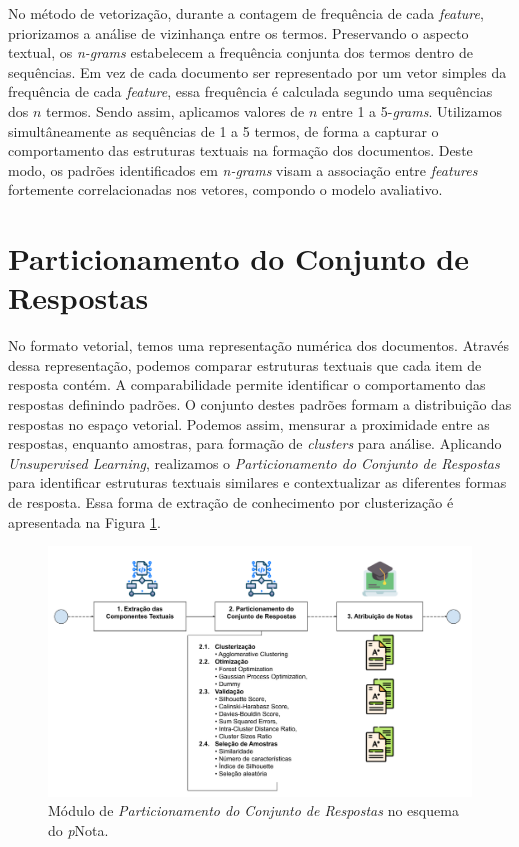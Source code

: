No método de vetorização, durante a contagem de frequência de cada \textit{feature}, priorizamos a análise de vizinhança entre os termos. Preservando o aspecto textual, os \textit{n-grams} estabelecem a frequência conjunta dos termos dentro de sequências. Em vez de cada documento ser representado por um vetor simples da frequência de cada \textit{feature}, essa frequência é calculada segundo uma sequências dos $ n $ termos. Sendo assim, aplicamos valores de $ n $ entre 1 a 5-\textit{grams}. Utilizamos simultâneamente as sequências de 1 a 5 termos, de forma a capturar o comportamento das estruturas textuais na formação dos documentos. Deste modo, os padrões identificados em \textit{n-grams} \cite{spalenza2020} visam a associação entre \textit{features} fortemente correlacionadas nos vetores, compondo o modelo avaliativo.


\section{Particionamento do Conjunto de Respostas}
\label{sec-amostragem}

No formato vetorial, temos uma representação numérica dos documentos. Através dessa representação, podemos comparar estruturas textuais que cada item de resposta contém. A comparabilidade permite identificar o comportamento das respostas definindo padrões. O conjunto destes padrões formam a distribuição das respostas no espaço vetorial. Podemos assim, mensurar a proximidade entre as respostas, enquanto amostras, para formação de \textit{clusters} para análise. Aplicando \textit{Unsupervised Learning}, realizamos o \textit{Particionamento do Conjunto de Respostas} para identificar estruturas textuais similares e contextualizar as diferentes formas de resposta. Essa forma de extração de conhecimento por clusterização é apresentada na Figura \ref{fig-pcr}.

\begin{figure}[!h]
\centering
\includegraphics[width=\textwidth]{figuras/esquema-pcr-pNota.png}
\caption{Módulo de \textit{Particionamento do Conjunto de Respostas} no esquema do \textit{p}Nota.}
\label{fig-pcr}
\end{figure}

